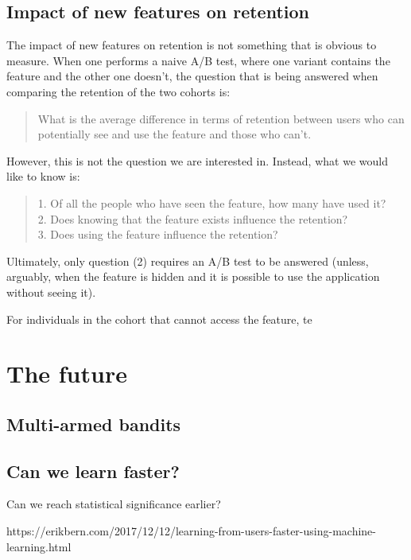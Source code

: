 \documentclass{tufte-book}
\begin{document}
\section{Impact of new features on retention}

The impact of new features on retention is not something that is obvious to
measure. When one performs a naive A/B test, where one variant contains the
feature and the other one doesn't, the question that is being answered when
comparing the retention of the two cohorts is:

\begin{quotation}
	What is the average difference in terms of retention between users who
	can potentially see and use the feature and those who can't.
\end{quotation}

However, this is not the question we are interested in. Instead, what we would
like to know is:

\begin{quotation}
    1. Of all the people who have seen the feature, how many have used it?\\
    2. Does knowing that the feature exists influence the retention?\\
    3. Does using the feature influence the retention?
\end{quotation}

Ultimately, only question (2) requires an A/B test to be answered (unless,
arguably, when the feature is hidden and it is possible to use the application
without seeing it).

For individuals in the cohort that cannot access the feature, te

\chapter{The future}
\section{Multi-armed bandits}

\section{Can we learn faster?}

Can we reach statistical significance earlier?

https://erikbern.com/2017/12/12/learning-from-users-faster-using-machine-learning.html
\end{document}
